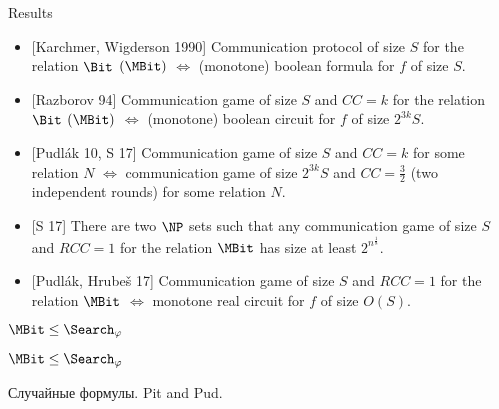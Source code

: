 \begin{frame}{Results}
    \begin{itemize}
        \item {[Karchmer, Wigderson 1990]} Communication protocol of size $S$ for the relation $\Bit$
            \alert{$(\MBit)$} $\Leftrightarrow$ \alert{(monotone)} boolean formula for $f$ of size $S$.
        \item {[Razborov 94]} Communication game of size $S$ and $CC = k$ for the relation $\Bit$
            \alert{$(\MBit)$} $\Leftrightarrow$ \alert{(monotone)} boolean circuit for $f$ of size
            $2^{3k} S$.
        \pause
        \item {[Pudl{\'{a}}k 10, S 17]} Communication game of size $S$ and $CC = k$ for some relation $N$
            $\Leftrightarrow$ communication game of size $2^{3k} S$ and $CC = \frac{3}{2}$ (two
            independent rounds) for some relation $N$.
    \end{itemize}
    
    \vspace{0.3cm}
    \pause
    \begin{itemize}                
        \item {[S 17]} There are two $\NP$ sets such that any communication game of size $S$ and $RCC = 1$
            for the relation $\MBit$ has size at least $2^{n^{\frac{1}{8}}}$.
        \pause    
        \item {[Pudl{\'{a}}k, Hrube{\v{s}} 17]} Communication game of size $S$ and $RCC = 1$ for the
            relation $\MBit$ $\Leftrightarrow$ monotone {\color{blue} real}
            circuit for $f$ of size $O(S)$.
    \end{itemize}
\end{frame}
    


\begin{frame}{$\MBit \le \Search_{\varphi}$}


\end{frame}


\begin{frame}{$\MBit \le \Search_{\varphi}$}

	Случайные формулы.  Pit and Pud.
\end{frame}